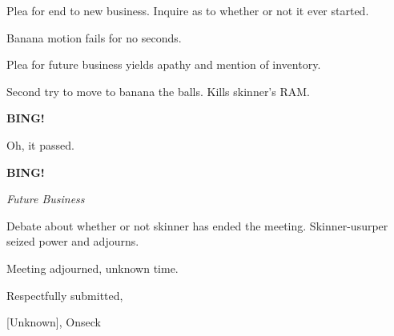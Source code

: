 \documentclass[12pt]{article}
\newcommand{\bing}{{\bf BING!} }
\newcommand{\goto}[1]{\bing \vskip 12pt \centerline{{\em{#1}}}}
\begin{document}
Plea for end to new business. Inquire as to whether or not it ever started.

Banana motion fails for no seconds.

Plea for future business yields apathy and mention of inventory.

Second try to move to banana the balls. Kills skinner's RAM.

\bing

Oh, it passed.

\goto{Future Business}

Debate about whether or not skinner has ended the meeting. Skinner-usurper seized power and adjourns.

\vspace{12pt}

\noindent
Meeting adjourned, unknown time.

\vspace{18pt}

\centerline{Respectfully submitted,}
\centerline{[Unknown], Onseck}
\end{document}
